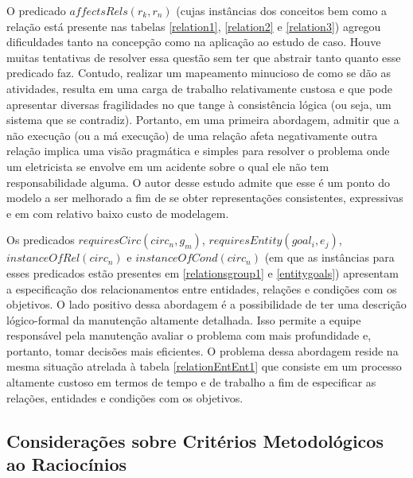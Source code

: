 O predicado $affectsRels(r_k,r_n)$ (cujas instâncias dos conceitos bem como a relação está presente nas tabelas \ref{relation1}, \ref{relation2} e \ref{relation3}) agregou dificuldades tanto na concepção como na aplicação ao estudo de caso. Houve muitas tentativas de resolver essa questão sem ter que abstrair tanto quanto esse predicado faz. Contudo, realizar um mapeamento minucioso de como se dão as atividades, resulta em uma carga de trabalho relativamente custosa e que pode apresentar diversas fragilidades no que tange à consistência lógica (ou seja, um sistema que se contradiz). Portanto, em uma primeira abordagem, admitir que a não execução (ou a má execução) de uma relação afeta negativamente outra relação implica uma visão pragmática e simples para resolver o problema onde um eletricista se envolve em um acidente sobre o qual ele não tem responsabilidade alguma. O autor desse estudo admite que esse é um ponto do modelo a ser melhorado a fim de se obter representações consistentes, expressivas e em com relativo baixo custo de modelagem. 

Os predicados $requiresCirc(circ_n,g_m)$, $requiresEntity(goal_i, e_j)$, $instanceOfRel(circ_n)$ e $instanceOfCond(circ_n)$ (em que as instâncias para esses predicados estão presentes em \ref{relationsgroup1} e \ref{entitygoals}) apresentam a especificação dos relacionamentos entre entidades, relações e condições com os objetivos. O lado positivo dessa abordagem é a possibilidade de ter uma descrição lógico-formal da manutenção altamente detalhada. Isso permite a equipe responsável pela manutenção avaliar o problema com mais profundidade e, portanto, tomar decisões mais eficientes. O problema dessa abordagem reside na mesma situação atrelada à tabela \ref{relationEntEnt1} que consiste em um processo altamente custoso em termos de tempo e de trabalho a fim de especificar as relações, entidades e condições com os objetivos. 

\subsection{Considerações sobre Critérios Metodológicos ao Raciocínios} \label{conscritmetrac}

